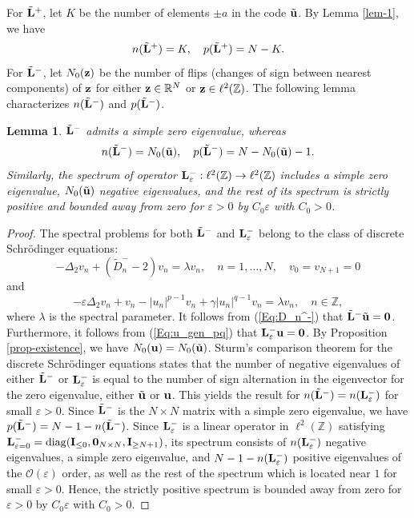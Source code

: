 \documentclass[12pt,reqno]{amsart}
\newtheorem{lemma}{Lemma}
\begin{document}
For $\tilde{\bf L}^+$, let $K$ be the number of elements $\pm a$ in the code $\tilde{\bf u}$. By Lemma \ref{lem-1}, we have 
\begin{equation}
\label{neg-2}
n(\tilde{\bf L}^+) = K, \quad p(\tilde{\bf L}^+) = N-K.
\end{equation}  
For $\tilde{\bf L}^-$, let $N_0({\bf z})$ be the number of flips (changes of sign between nearest components) of ${\bf z}$ for either ${\bf z} \in \mathbb{R}^N$ or ${\bf z} \in \ell^2(\mathbb{Z})$. The following 
lemma characterizes $n(\tilde{\bf L}^-)$ and $p(\tilde{\bf L}^-)$. 

\begin{lemma}
	\label{theorem-2}
$\tilde{\bf L}^-$ admits a simple zero eigenvalue, whereas
	\begin{equation}
	\label{neg-1}
	n(\tilde{\bf L}^-) = N_0(\tilde{\bf u}), \quad p(\tilde{\bf L}^-) = N-N_0(\tilde{\bf u})-1. 
	\end{equation}
Similarly, the spectrum of operator ${\bf L}^-_{\varepsilon} : \ell^2(\mathbb{Z}) \to \ell^2(\mathbb{Z})$ includes a simple zero eigenvalue, $N_0(\tilde{\bf u})$ negative eigenvalues, and the rest of its spectrum is strictly positive and bounded away from zero for $\varepsilon > 0$ by $C_0 \varepsilon$ with $C_0 > 0$.
\end{lemma}

\begin{proof}
	The spectral problems for both $\tilde{\bf L}^-$ and ${\bf L}^-_{\varepsilon}$ belong to the class of discrete Schr\"{o}dinger equations:
	$$
-\Delta_2 v_n + (\tilde{D}_n^- - 2) v_n = \lambda v_n, \quad n = 1,\dots,N, 
\quad v_0 = v_{N+1} = 0
	$$
	and
	$$
	-\varepsilon \Delta_2 v_n + v_n - |u_n|^{p-1} v_n + \gamma |u_n|^{q-1} v_n = \lambda v_n, \quad n \in \mathbb{Z},
	$$
	where $\lambda$ is the spectral parameter. It follows from 
	(\ref{Eq:D_n^-}) that $\tilde{\bf L}^-\tilde{\bf u}={\bf 0}$. 
	Furthermore, it follows from (\ref{Eq:u_gen_pq}) that 
	${\bf L}^-_{\varepsilon} {\bf u}={\bf 0}$. By Proposition \ref{prop-existence}, we have $N_0({\bf u})= N_0(\tilde{\bf u})$. 
	Sturm's comparison theorem for the discrete Schr\"{o}dinger equations \cite{LL} 
	states that the number of negative eigenvalues of either $\tilde{\bf L}^-$ or ${\bf L}^-_{\varepsilon}$ is equal to the number of sign alternation 
	in the eigenvector for the zero eigenvalue, either $\tilde{\bf u}$ or ${\bf u}$. This yields the result for $n(\tilde{\bf L}^-) = n({\bf L}^-_{\varepsilon})$ for small $\varepsilon > 0$. Since $\tilde{\bf L}^-$ is the $N\times N$ matrix with a simple zero eigenvalue, we have 
	$p(\tilde{\bf L}^-)= N - 1 -  n(\tilde{\bf L}^-)$. Since ${\bf L}^-_{\varepsilon}$ is a linear operator in $\ell^2(\mathbb{Z})$ 
	satisfying ${\bf L}_{\varepsilon = 0}^- = {\rm diag}({\bf I}_{\leq 0},{\bf 0}_{N \times N},{\bf I}_{\geq N+1})$, its spectrum consists of 
	$n({\bf L}^-_{\varepsilon})$ negative eigenvalues, a simple zero eigenvalue, and $N-1-n({\bf L}^-_{\varepsilon})$ positive eigenvalues of the $\mathcal{O}(\varepsilon)$ order, as well as the rest of the spectrum which is located near $1$ for small $\varepsilon > 0$. Hence, the strictly positive spectrum is bounded away from zero for $\varepsilon > 0$ by $C_0 \varepsilon$ with $C_0 > 0$.
\end{proof}
\end{document}

